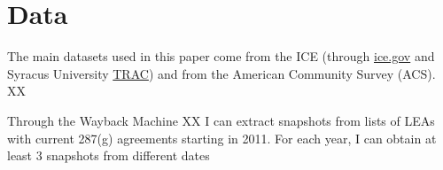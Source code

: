 \documentclass{article}
\begin{document}
\section{Data}
The main datasets used in this paper come from the ICE (through \hyperlink{https://www.ice.gov}{ice.gov} and Syracus University \hyperlink{https://tracreports.org/immigration/tools/}{TRAC}) and from the American Community Survey (ACS). XX

Through the Wayback Machine XX I can extract snapshots from lists of LEAs with current 287(g) agreements starting in 2011. For each year, I can obtain at least 3 snapshots from different dates 


\end{document}
